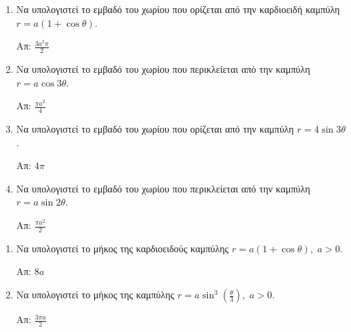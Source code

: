


\everymath{\displaystyle}

\thispagestyle{empty}


\begin{center}
\end{center}

\vspace{\baselineskip}

\begin{center}
\end{center}

\vspace{\baselineskip}

\begin{enumerate}
	\item Να υπολογιστεί το εμβαδό του χωρίου που ορίζεται από την καρδιοειδή καμπύλη
        $ r = a(1  + \cos{\theta}) $.

		\hfill Απ: $ \frac{3a^{2}\pi}{2} $

	\item Να υπολογιστεί το εμβαδό του χωρίου που περικλείεται από την καμπύλη $
		r = a \cos{3\theta} $.

		\hfill Απ: $ \frac{\pi a^{2}}{4} $

	\item Να υπολογιστεί το εμβαδό του χωρίου που ορίζεται από την καμπύλη 
        $ r = 4 \sin{3\theta}  $. 

        \hfill Απ: $ 4 \pi $  

	\item Να υπολογιστεί το εμβαδό του χωρίου που περικλείεται από την καμπύλη $
		r = a \sin{2\theta} $.

		\hfill Απ: $ \frac{\pi a^{2}}{2} $

\end{enumerate}

\begin{center}
\end{center}

\vspace{\baselineskip}

\begin{enumerate}

    \item Να υπολογιστεί το μήκος της καρδιοειδούς καμπύλης $ r = a(1 + \cos{\theta}), 
        \; a>0 $.

		\hfill Απ: $ 8 a $

	\item Να υπολογιστεί το μήκος της καμπύλης 
        $ r = a\sin^{3}{\left(\frac{\theta}{3}\right)}, \; a>0 $.

        \hfill Απ: $ \frac{3 \pi a}{2} $ 
\end{enumerate}

